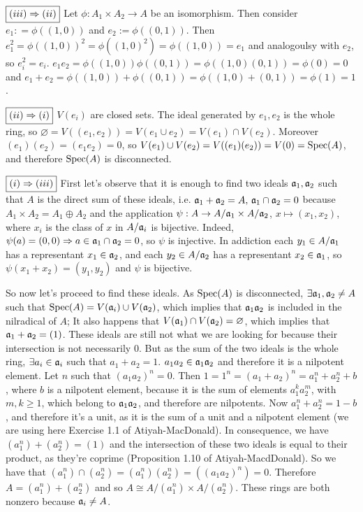 \begin{sol}
	$\boxed{(iii) \Rightarrow (ii)}$ Let $\phi: A_1 \times A_2 \to A$ be an isomorphism. Then consider $e_1: = \phi((1,0))$ and $e_2 := \phi((0,1))$. Then $e_1^2 = \phi((1,0))^2 = \phi((1,0)^2) = \phi((1,0)) = e_1$ and analogoulsy with $e_2$, so $e_i^2 = e_i$. $e_1 e_2 = \phi((1,0))\phi((0,1)) = \phi((1,0)(0,1)) = \phi(0) = 0$ and $e_1 + e_2 = \phi((1,0)) + \phi((0,1)) = \phi((1,0)+ (0,1)) = \phi(1) = 1$.

	$\boxed{(ii) \Rightarrow (i)}$ $V(e_i)$ are closed sets. The ideal generated by $e_1, e_2$ is the whole ring, so $\varnothing = V((e_1,e_2)) = V(e_1 \cup e_2) = V(e_1) \cap V(e_2)$. Moreover $(e_1)(e_2) = (e_1e_2) = 0$, so $V(e_1) \cup V(e_2) = V((e_1)(e_2)) = V(0) = \mathrm{Spec}(A)$, and therefore $\mathrm{Spec}(A)$ is disconnected.

	$\boxed{(i) \Rightarrow (iii)}$ First let's observe that it is enough to find two ideals $\mathfrak{a}_1, \mathfrak{a}_2$ such that $A$ is the direct sum of these ideals, i.e. $\mathfrak{a}_1 + \mathfrak{a}_2 = A, \, \mathfrak{a}_1 \cap \mathfrak{a}_2 = 0$ because $A_1 \times A_2 = A_1 \oplus A_2$ and the application $\psi: A \to A/\mathfrak{a}_1 \times A/\mathfrak{a}_2$, $x \mapsto (x_1, x_2)$, where $x_i$ is the class of $x$ in $A/\mathfrak{a}_i$ is bijective. Indeed, $\psi(a) = (0,0) \Rightarrow a \in \mathfrak{a}_1 \cap \mathfrak{a}_2 = 0$, so $\psi$ is injective. In addiction each $y_1 \in A/\mathfrak{a}_1$ has a representant $x_1 \in \mathfrak{a}_2$, and each $y_2 \in A/\mathfrak{a}_2$ has a representant $x_2 \in \mathfrak{a}_1$, so $\psi(x_1+x_2) = (y_1, y_2)$ and $\psi$ is bijective.

	So now let's proceed to find these ideals. As $\mathrm{Spec}(A)$ is disconnected, $\exists \mathfrak{a}_1, \mathfrak{a}_2 \neq A$ such that $\mathrm{Spec}(A) = V(\mathfrak{a}_i) \cup V(\mathfrak{a}_2)$, which implies that $\mathfrak{a}_1 \mathfrak{a}_2$ is included in the nilradical of $A$; It also happens that $V(\mathfrak{a}_1) \cap V(\mathfrak{a}_2) = \varnothing$, which implies that $\mathfrak{a}_1 + \mathfrak{a}_2 = (1)$. These ideals are still not what we are looking for because their intersection is not necessarily $0$. But as the sum of the two ideals is the whole ring, $\exists a_i \in \mathfrak{a}_i$ such that $a_1 + a_2 = 1$. $a_1a_2 \in \mathfrak{a}_1 \mathfrak{a}_2$ and therefore it is a nilpotent element. Let $n$ such that $(a_1a_2)^n = 0$. Then $1 = 1^n = (a_1+a_2)^n = a_1^n + a_2^n + b$, where $b$ is a nilpotent element, because it is the sum of elements $a_1^k a_2^m$, with $m, k \geq 1$, which belong to $\mathfrak{a}_1 \mathfrak{a}_2$, and therefore are nilpotents. Now $a_1^n + a_2^n = 1-b$, and therefore it's a unit, as it is the sum of a unit and a nilpotent element (we are using here Exercise 1.1 of Atiyah-MacDonald). In consequence, we have $(a_1^n) + (a_2^n) = (1)$ and the intersection of these two ideals is equal to their product, as they're coprime (Proposition 1.10 of Atiyah-MacdDonald). So we have that $(a_1^n) \cap (a_2^n) = (a_1^n)(a_2^n) = ((a_1a_2)^n) = 0$. Therefore $A = (a_1^n) + (a_2^n)$ and so $A \cong A/(a_1^n) \times A/(a_2^n)$. These rings are both nonzero because $\mathfrak{a}_i \neq A$.

\end{sol}